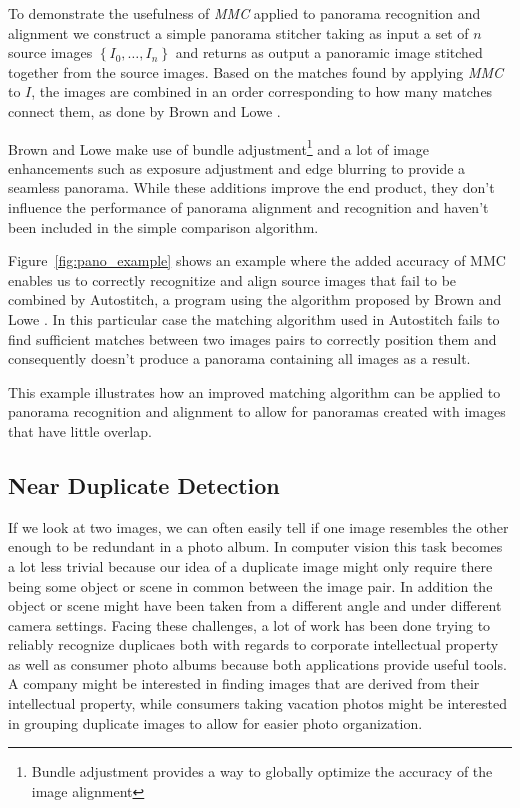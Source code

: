 \documentclass{article}
\begin{document}
To demonstrate the usefulness of \emph{MMC} applied to panorama 
recognition and alignment we construct a simple panorama stitcher taking
as input a set of $n$ source images $\left\{I_0, \ldots, I_n\right\}$ 
and returns as output a panoramic image stitched together from the 
source images. Based on the matches found by applying \emph{MMC} to $I$, 
the images are combined in an order corresponding to how many matches 
connect them, as done by Brown and Lowe \cite{brown2007automatic}.

Brown and Lowe make use of bundle adjustment\footnote{Bundle adjustment 
provides a way to globally optimize the accuracy of the image alignment} 
and a lot of image enhancements such as exposure adjustment and edge 
blurring to provide a seamless panorama. While these additions improve 
the end product, they don't influence the performance of panorama 
alignment and recognition and haven't been included in the simple 
comparison algorithm.

Figure~\ref{fig:pano_example} shows an example where the added accuracy 
of MMC enables us to correctly recognitize and align source images that 
fail to be combined by Autostitch, a program using the algorithm 
proposed by Brown and Lowe \cite{brown2007automatic}. In this particular
case the matching algorithm used in Autostitch fails to find sufficient 
matches between two images pairs to correctly position them and 
consequently doesn't produce a panorama containing all images as a 
result.

This example illustrates how an improved matching algorithm can be 
applied to panorama recognition and alignment to allow for panoramas 
created with images that have little overlap.

\subsection{Near Duplicate Detection}
If we look at two images, we can often easily tell if one image 
resembles the other enough to be redundant in a photo album. In computer 
vision this task becomes a lot less trivial because our idea of a 
duplicate image might only require there being some object or scene in 
common between the image pair. In addition the object or scene might 
have been taken from a different angle and under different camera 
settings. Facing these challenges, a lot of work has been done trying to 
reliably recognize duplicaes both with regards to corporate intellectual 
property as well as consumer photo albums because both applications 
provide useful tools.  A company might be interested in finding images 
that are derived from their intellectual property, while consumers 
taking vacation photos might be interested in grouping duplicate images 
to allow for easier photo organization.
\end{document}
